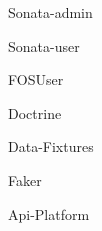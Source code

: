 \item Sonata-admin
\item Sonata-user
\item FOSUser
\item Doctrine
\item Data-Fixtures
\item Faker
\item Api-Platform
